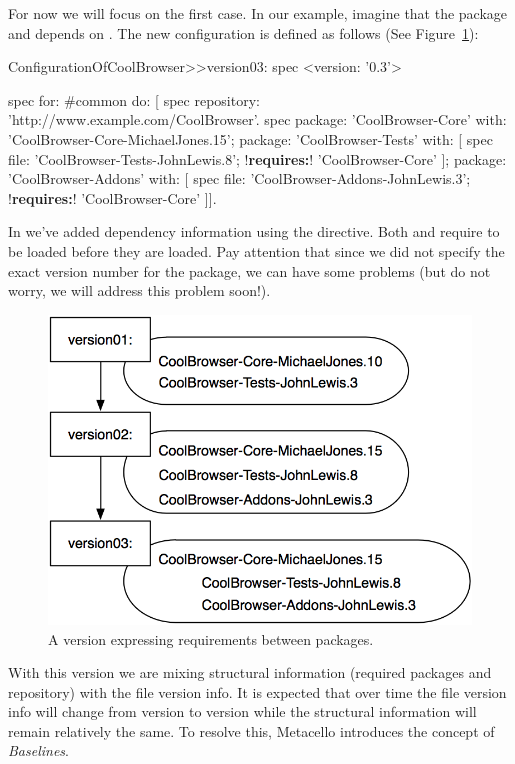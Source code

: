 \documentclass[a4paper,10pt,twoside]{book}
\begin{document}
For now we will focus on the first case. In our example, imagine that the package  and  depends on . The new configuration  is defined as follows (See Figure~\ref{fig:version03}):

\begin{code}{}
ConfigurationOfCoolBrowser>>version03: spec 
	<version: '0.3'>
	
	spec for: #common do: [
		spec repository: 'http://www.example.com/CoolBrowser'.
		spec 
			package: 'CoolBrowser-Core' with: 'CoolBrowser-Core-MichaelJones.15';
			package: 'CoolBrowser-Tests' with: [
				spec 
					file: 'CoolBrowser-Tests-JohnLewis.8';
					!\textbf{requires:}! 'CoolBrowser-Core' ];
			package: 'CoolBrowser-Addons' with: [
				spec 
					file: 'CoolBrowser-Addons-JohnLewis.3';
					!\textbf{requires:}! 'CoolBrowser-Core' ]].
\end{code}

In  we've added dependency information using the  directive.
Both  and   require  to be loaded before they are loaded. Pay attention that since we did not specify the exact version number for the  package, we can have some problems (but do not worry, we will address this problem soon!).

\begin{figure}
\begin{center}
\includegraphics[width=0.6\linewidth]{version03}
\caption{A version expressing requirements between packages.\label{fig:version03}}
\end{center}
\end{figure} 


With this version we are mixing structural information (required packages and repository) with the file version info. It is expected that over time the file version info will change from
version to version while the structural information will remain relatively the same. To resolve this, Metacello introduces the concept of {\em Baselines}.
\end{document}
